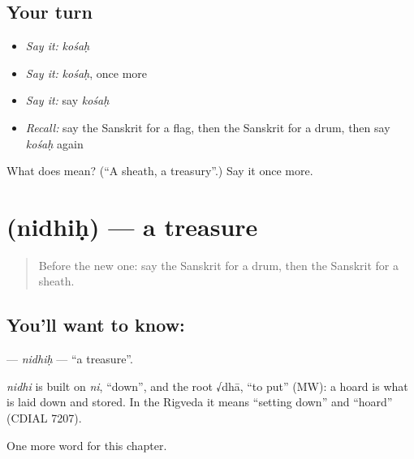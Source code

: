 \subsection*{Your turn}
\begin{itemize}
\raggedright
  \item \emph{Say it:} \emph{kośaḥ}
  \item \emph{Say it:} \emph{kośaḥ}, once more
  \item \emph{Say it:} say \emph{kośaḥ}
  \item \emph{Recall:} say the Sanskrit for a flag, then the Sanskrit for a drum, then say \emph{kośaḥ} again
\end{itemize}

\begin{tcolorbox}[breakable,colback=teal!4,colframe=teal!35!black,title={Before you move on}]
What does  mean? (\textquotedblleft{}A sheath, a treasury\textquotedblright{}.) Say it once more.
\end{tcolorbox}
\section[\texorpdfstring{\sk{निधिः} (nidhiḥ)}{निधिः (nidhiḥ)}]{ (nidhiḥ) — a treasure}

\label{lesson:SA-C248-nidhih}



\begin{quote}
Before the new one: say the Sanskrit for a drum, then the Sanskrit for a sheath.
\end{quote}

\subsection*{You'll want to know: }
\textbf{} — \emph{nidhiḥ} — \textquotedblleft{}a treasure\textquotedblright{}.

\begin{cousinweb}
\emph{nidhi} is built on \emph{ni}, \textquotedblleft{}down\textquotedblright{}, and the root √dhā, \textquotedblleft{}to put\textquotedblright{} (MW): a hoard is what is laid down and stored. In the Rigveda it means \textquotedblleft{}setting down\textquotedblright{} and \textquotedblleft{}hoard\textquotedblright{} (CDIAL 7207).
\end{cousinweb}

\begin{grammarlens}[title={What you've built}]
One more word for this chapter.
\end{grammarlens}

